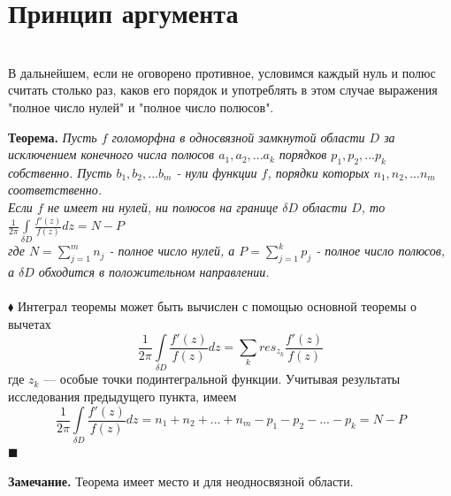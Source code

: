 \documentclass[a4paper, 12pt]{report}
\begin{document}
\section{Принцип аргумента }
\\В дальнейшем, если не оговорено противное, условимся каждый нуль и полюс считать столько раз, каков его порядок и употреблять в этом случае выражения "полное число нулей" и "полное число полюсов".
\par\bigskip
\textbf{Теорема.} \quad
\textit{Пусть \(f\) голоморфна в односвязной замкнутой области \(D\) за исключением конечного числа полюсов \(a_1, a_2, ... a_k\) порядков \(p_1, p_2, ... p_k\) собственно. Пусть \(b_1, b_2, ... b_m\) - нули функции \(f\), порядки которых \(n_1, n_2, ... n_m\) соответственно. 
\\Если \(f\) не имеет ни нулей, ни полюсов на границе \(\delta D\) области \(D\), то 
\( \frac{1}{2\pi} \int\limits_{\delta D}  \frac{f'(z)}{f(z)} dz = N-P\)
\\ где \( N = \sum\limits_{j=1}^{m} n_j \) - полное число нулей, а \( P= \sum\limits_{j=1}^{k} p_j\) - полное число полюсов, а \(\delta D\) обходится в положительном направлении.}\\
\bigskip
\\$\blacklozenge$ \hspace{1 mm} Интеграл теоремы может быть вычислен с помощью основной теоремы о вычетах $$ \frac{1}{2\pi} \int\limits_{\delta D}  \frac{f'(z)}{f(z)} dz = \sum\limits_{k} res_{z_k} \frac{f'(z)}{f(z)}  $$ где \(z_k\) --- особые точки подинтегральной функции. Учитывая результаты исследования предыдущего пункта, имеем  $$ \frac{1}{2\pi} \int\limits_{\delta D}  \frac{f'(z)}{f(z)} dz = n_1 + n_2 + ... + n_m - p_1 - p_2 - ... - p_k = N-P$$  $\blacksquare $  

\par\bigskip
\textbf{Замечание.} \quad Теорема имеет место и для неодносвязной области. 
\end{document}
